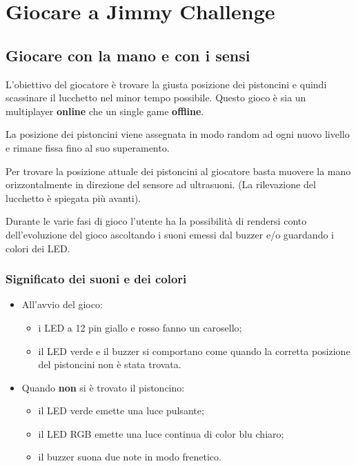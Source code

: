 \chapter{Giocare a Jimmy Challenge}
\section{Giocare con la mano e con i sensi}
L'obiettivo del giocatore è trovare la giusta posizione dei pistoncini e quindi scassinare il lucchetto nel minor tempo possibile. Questo gioco è sia un multiplayer \textbf{online} che un single game \textbf{offline}.

La posizione dei pistoncini viene assegnata in modo random ad ogni nuovo livello e rimane fissa fino al suo superamento.

Per trovare la posizione attuale dei pistoncini al giocatore basta muovere la mano orizzontalmente in direzione del sensore ad ultrasuoni. (La rilevazione del lucchetto è spiegata più avanti).

Durante le varie fasi di gioco l'utente ha la possibilità di rendersi conto dell'evoluzione del gioco ascoltando i suoni emessi dal buzzer e/o guardando i colori dei LED.

\subsection{Significato dei suoni e dei colori}
\begin{itemize}
	\item All'avvio del gioco:
	\begin{itemize}
		\item i LED a 12 pin giallo e rosso fanno un carosello;
		\item il LED verde e il buzzer si comportano come quando la corretta posizione del pistoncini non è stata trovata.
	\end{itemize}
\end{itemize}

\begin{itemize}
	\item Quando \textbf{non} si è trovato il pistoncino:
	\begin{itemize}
		\item il LED verde emette una luce pulsante;
		\item il LED RGB emette una luce continua di color blu chiaro;
		\item il buzzer suona due note in modo frenetico.
	\end{itemize}
\end{itemize}

